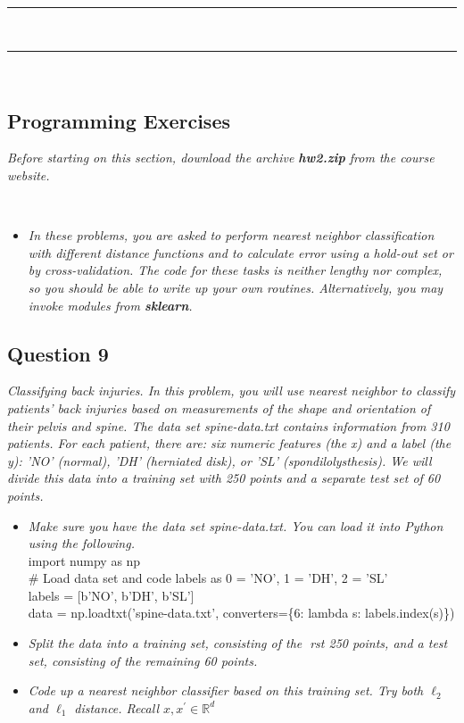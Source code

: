\documentclass{article}
\begin{document}
\noindent\rule{\textwidth}{0.4pt}\\

\noindent\rule{\textwidth}{0.4pt}\\


\newpage

\subsection*{Programming Exercises}

\parbox{\textwidth}{\textit{Before starting on this section, download the archive \textbf{hw2.zip} from the course website.}}\\
\begin{itemize}
    \item \textit{In these problems, you are asked to perform nearest neighbor classification with different distance functions and to calculate error using a hold-out set or by cross-validation. The code for these tasks is neither lengthy nor complex, so you should be able to write up your own routines. Alternatively, you may invoke modules from \textbf{sklearn}.}
\end{itemize}

\parbox{\textwidth}{}

\subsection*{Question 9}

\textit{Classifying back injuries. In this problem, you will use nearest neighbor to classify patients' back
injuries based on measurements of the shape and orientation of their pelvis and spine.
The data set spine-data.txt contains information from 310 patients. For each patient, there are:
six numeric features (the x) and a label (the y): 'NO' (normal), 'DH' (herniated disk), or 'SL'
(spondilolysthesis). We will divide this data into a training set with 250 points and a separate test set
of 60 points.}

\begin{itemize}
    \item \textit{Make sure you have the data set spine-data.txt. You can load it into Python using the following.}\\
    import numpy as np\\
    \# Load data set and code labels as 0 = 'NO', 1 = 'DH', 2 = 'SL'\\
    labels = [b'NO', b'DH', b'SL']\\
    data = np.loadtxt('spine-data.txt', converters=\{6: lambda s: labels.index(s)\})\\
    \item \textit{Split the data into a training set, consisting of the rst 250 points, and a test set, consisting of
the remaining 60 points.}
    \item \textit{Code up a nearest neighbor classifier based on this training set. Try both $\ell_2$ and $\ell_1$ distance. Recall $x, x^{\prime} \in \mathbb{R}^d$}
\end{itemize}
\end{document}
